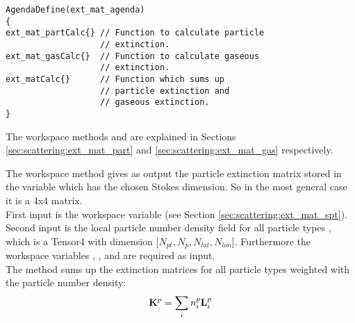 \vspace{1ex}
\begin{minipage}{0.9\hsize}
\begin{verbatim}
AgendaDefine(ext_mat_agenda)
{
ext_mat_partCalc{} // Function to calculate particle
                   // extinction.
ext_mat_gasCalc{}  // Function to calculate gaseous
                   // extinction. 
ext_matCalc{}      // Function which sums up
                   // particle extinction and 
                   // gaseous extinction.
}
\end{verbatim}
\end{minipage}

\vspace{2ex}
\noindent
The workspace methods  and
 are explained in Sections
\ref{sec:scattering:ext_mat_part} and \ref{sec:scattering:ext_mat_gas}
respectively.

\label{sec:scattering:ext_mat_part}

The workspace method  gives as output the
particle extinction matrix  stored in the variable
 which has the chosen Stokes dimension. So in
the most general case it is a 4x4 matrix.\\
First input is the workspace variable  (see Section
\ref{sec:scattering:ext_mat_spt}). Second input is the
local particle number density field for all particle types
, which
 is a Tensor4 with dimension 
[$N_{pt}, N_{p}, N_{lat}, N_{lon}$]. Furthermore the  workspace
variables
, ,
 and  are
required as input. \\
The method sums up the extinction matrices for all particle types
weighted with the particle number density:
\begin{eqnarray}
  {\bf K}^{p} = \sum_i n^p_i {\bf L}^{p}_i 
\end{eqnarray}


\label{sec:scattering:ext_mat_gas}

\label{sec:scattering:ext_mat_spt}


